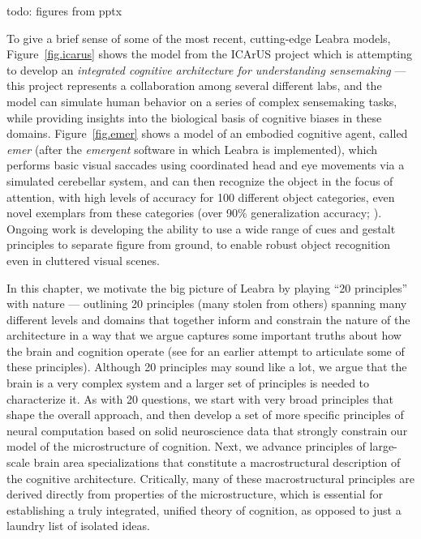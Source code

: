 \documentclass[11pt,twoside]{article}
\begin{document}
todo: figures from pptx

To give a brief sense of some of the most recent, cutting-edge Leabra
models, Figure~\ref{fig.icarus} shows the model from the ICArUS
project which is attempting to develop an {\em integrated cognitive
  architecture for understanding sensemaking} --- this project
represents a collaboration among several different labs, and the model
can simulate human behavior on a series of complex sensemaking tasks,
while providing insights into the biological basis of cognitive biases
in these domains.  Figure~\ref{fig.emer} shows a model of an embodied
cognitive agent, called {\em emer} (after the {\em emergent} software
in which Leabra is implemented), which performs basic visual saccades
using coordinated head and eye movements via a simulated cerebellar
system, and can then recognize the object in the focus of attention,
with high levels of accuracy for 100 different object categories, even
novel exemplars from these categories (over 90\% generalization
accuracy; \cite{OReillyEtAlLvis}).  Ongoing work is developing the
ability to use a wide range of cues and gestalt principles to separate
figure from ground, to enable robust object recognition even in
cluttered visual scenes.

In this chapter, we motivate the big picture of Leabra by playing ``20
principles'' with nature --- outlining 20 principles (many stolen from
others) spanning many different levels and domains that together
inform and constrain the nature of the architecture in a way that we
argue captures some important truths about how the brain and cognition
operate (see  for an earlier attempt to articulate
some of these principles).  Although 20 principles may sound like a
lot, we argue that the brain is a very complex system and a larger set
of principles is needed to characterize it.  As with 20 questions, we
start with very broad principles that shape the overall approach, and
 then develop a set of more specific principles of neural computation
 based on solid neuroscience data that strongly constrain our model of
 the microstructure of cognition.  Next, we advance principles of
 large-scale brain area specializations that constitute a
 macrostructural description of the cognitive architecture.
  Critically, many of these macrostructural principles are derived
 directly from properties of the microstructure, which is essential
 for establishing a truly integrated, unified theory of cognition, as
 opposed to just a laundry list of isolated ideas.
\end{document}
